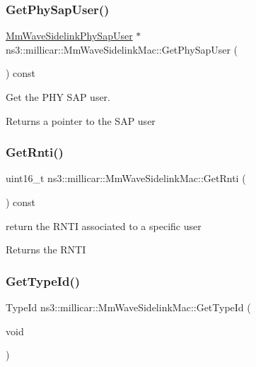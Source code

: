\subsubsection{\texorpdfstring{Get\+Phy\+Sap\+User()}{GetPhySapUser()}}
{\footnotesize\ttfamily \hyperlink{classns3_1_1millicar_1_1MmWaveSidelinkPhySapUser}{Mm\+Wave\+Sidelink\+Phy\+Sap\+User} $\ast$ ns3\+::millicar\+::\+Mm\+Wave\+Sidelink\+Mac\+::\+Get\+Phy\+Sap\+User (\begin{DoxyParamCaption}{ }\end{DoxyParamCaption}) const}



Get the P\+HY S\+AP user. 

\begin{DoxyReturn}{Returns}
a pointer to the S\+AP user 
\end{DoxyReturn}
\mbox{\label{classns3_1_1millicar_1_1MmWaveSidelinkMac_a229809ca241dc9416dfb8ec82d8e48f6}} 
\subsubsection{\texorpdfstring{Get\+Rnti()}{GetRnti()}}
{\footnotesize\ttfamily uint16\+\_\+t ns3\+::millicar\+::\+Mm\+Wave\+Sidelink\+Mac\+::\+Get\+Rnti (\begin{DoxyParamCaption}{ }\end{DoxyParamCaption}) const}



return the R\+N\+TI associated to a specific user 

\begin{DoxyReturn}{Returns}
the R\+N\+TI 
\end{DoxyReturn}
\mbox{\label{classns3_1_1millicar_1_1MmWaveSidelinkMac_a97fdea26e60baec2ab5f082da054e18e}} 
\subsubsection{\texorpdfstring{Get\+Type\+Id()}{GetTypeId()}}
{\footnotesize\ttfamily Type\+Id ns3\+::millicar\+::\+Mm\+Wave\+Sidelink\+Mac\+::\+Get\+Type\+Id (\begin{DoxyParamCaption}\item[{void}]{ }\end{DoxyParamCaption})\hspace{0.3cm}{\ttfamily [static]}}



